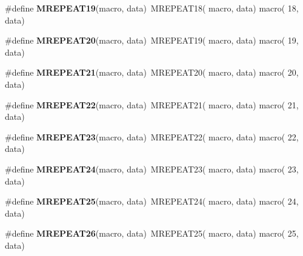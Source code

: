 \begin{DoxyCompactItemize}
\item 
\hypertarget{group__group__xmega__utils__mrepeat_ga9062731e6246bd538334f265e34870df}{\#define {\bfseries M\-R\-E\-P\-E\-A\-T19}(macro, data)~M\-R\-E\-P\-E\-A\-T18( macro, data)   macro( 18, data)}\label{group__group__xmega__utils__mrepeat_ga9062731e6246bd538334f265e34870df}

\item 
\hypertarget{group__group__xmega__utils__mrepeat_ga938b8f75b8eedaadcfec2c375f7c7d2a}{\#define {\bfseries M\-R\-E\-P\-E\-A\-T20}(macro, data)~M\-R\-E\-P\-E\-A\-T19( macro, data)   macro( 19, data)}\label{group__group__xmega__utils__mrepeat_ga938b8f75b8eedaadcfec2c375f7c7d2a}

\item 
\hypertarget{group__group__xmega__utils__mrepeat_ga7eaa38d60b2cfa155145e2d908577783}{\#define {\bfseries M\-R\-E\-P\-E\-A\-T21}(macro, data)~M\-R\-E\-P\-E\-A\-T20( macro, data)   macro( 20, data)}\label{group__group__xmega__utils__mrepeat_ga7eaa38d60b2cfa155145e2d908577783}

\item 
\hypertarget{group__group__xmega__utils__mrepeat_ga9ac17b91b98d21f0fdbfc1f4739fe0ed}{\#define {\bfseries M\-R\-E\-P\-E\-A\-T22}(macro, data)~M\-R\-E\-P\-E\-A\-T21( macro, data)   macro( 21, data)}\label{group__group__xmega__utils__mrepeat_ga9ac17b91b98d21f0fdbfc1f4739fe0ed}

\item 
\hypertarget{group__group__xmega__utils__mrepeat_gadd71c28e883bbbf5f033d518e35b230d}{\#define {\bfseries M\-R\-E\-P\-E\-A\-T23}(macro, data)~M\-R\-E\-P\-E\-A\-T22( macro, data)   macro( 22, data)}\label{group__group__xmega__utils__mrepeat_gadd71c28e883bbbf5f033d518e35b230d}

\item 
\hypertarget{group__group__xmega__utils__mrepeat_gaa40f282e37901ebbaac8b42af65e02fb}{\#define {\bfseries M\-R\-E\-P\-E\-A\-T24}(macro, data)~M\-R\-E\-P\-E\-A\-T23( macro, data)   macro( 23, data)}\label{group__group__xmega__utils__mrepeat_gaa40f282e37901ebbaac8b42af65e02fb}

\item 
\hypertarget{group__group__xmega__utils__mrepeat_ga10a7a74d8723d1fd28cdc2b0509854d2}{\#define {\bfseries M\-R\-E\-P\-E\-A\-T25}(macro, data)~M\-R\-E\-P\-E\-A\-T24( macro, data)   macro( 24, data)}\label{group__group__xmega__utils__mrepeat_ga10a7a74d8723d1fd28cdc2b0509854d2}

\item 
\hypertarget{group__group__xmega__utils__mrepeat_ga83d8975851482186f25f70bd64384a12}{\#define {\bfseries M\-R\-E\-P\-E\-A\-T26}(macro, data)~M\-R\-E\-P\-E\-A\-T25( macro, data)   macro( 25, data)}\label{group__group__xmega__utils__mrepeat_ga83d8975851482186f25f70bd64384a12}


\end{DoxyCompactItemize}
